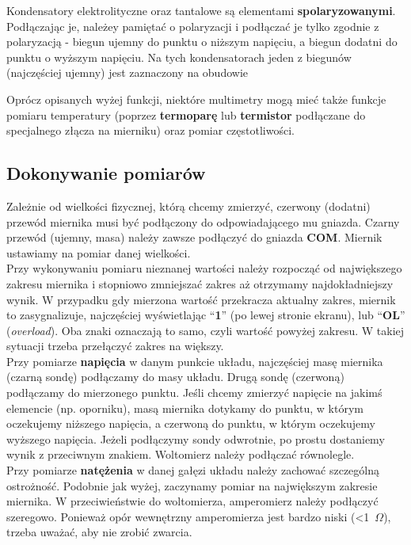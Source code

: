 \documentclass{pdfBooklets}
\begin{document}
\begin{ProTip}{}
  Kondensatory elektrolityczne oraz tantalowe są elementami \textbf{spolaryzowanymi}. Podłączając je, należey pamiętać o polaryzacji i podłączać je
  tylko zgodnie z polaryzacją - biegun ujemny do punktu o niższym napięciu, a biegun dodatni do punktu o wyższym napięciu. Na tych kondensatorach jeden
  z biegunów (najczęściej ujemny) jest zaznaczony na obudowie
\end{ProTip}

Oprócz opisanych wyżej funkcji, niektóre multimetry mogą mieć także funkcje pomiaru temperatury (poprzez \textbf{termoparę}
lub \textbf{termistor} podłączane do
specjalnego złącza na mierniku) oraz pomiar częstotliwości.

\subsection{Dokonywanie pomiarów}

Zależnie od wielkości fizycznej, którą chcemy zmierzyć, czerwony (dodatni) przewód miernika musi być podłączony do odpowiadającego
mu gniazda. Czarny przewód (ujemny, masa) należy zawsze podłączyć do gniazda \textbf{COM}. Miernik ustawiamy na pomiar danej
wielkości.
\\

Przy wykonywaniu pomiaru nieznanej wartości należy rozpocząć od największego zakresu miernika i stopniowo zmniejszać zakres aż
otrzymamy najdokładniejszy wynik. W przypadku gdy mierzona wartość przekracza aktualny zakres, miernik to zasygnalizuje, najczęściej
wyświetlając ``\textbf{1}'' (po lewej stronie ekranu), lub ``\textbf{OL}'' (\emph{overload}). Oba znaki oznaczają to samo, czyli wartość powyżej zakresu. W takiej sytuacji trzeba przełączyć zakres na większy.
\\

Przy pomiarze \textbf{napięcia} w danym punkcie układu, najczęściej masę miernika (czarną sondę)
podłączamy do masy układu. Drugą sondę (czerwoną) podłączamy do mierzonego punktu. Jeśli chcemy zmierzyć napięcie na jakimś elemencie (np. oporniku),
masą miernika dotykamy do punktu, w którym oczekujemy niższego napięcia, a czerwoną do punktu, w którym oczekujemy
wyższego napięcia. Jeżeli podłączymy sondy odwrotnie, po prostu dostaniemy wynik z przeciwnym znakiem. Woltomierz należy podłączać równolegle.
\\

Przy pomiarze \textbf{natężenia} w danej gałęzi układu należy zachować szczególną ostrożność. Podobnie jak wyżej, zaczynamy pomiar na największym
zakresie miernika. W przeciwieństwie do woltomierza, amperomierz należy podłączyć szeregowo. Ponieważ opór wewnętrzny amperomierza jest bardzo
niski (<1~$\Omega$), trzeba uważać, aby nie zrobić zwarcia.
\\
\end{document}
